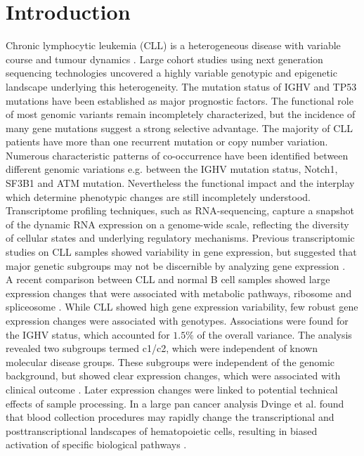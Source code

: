 

\section{Introduction}

Chronic lymphocytic leukemia (CLL) is a heterogeneous disease with variable course and tumour dynamics \citep{Zenz2010, Fabbri2016}. Large cohort studies using next generation sequencing technologies uncovered a highly variable genotypic and epigenetic landscape underlying this heterogeneity. The mutation status of IGHV and TP53 mutations have been established as major prognostic factors. The functional role of most genomic variants remain incompletely characterized, but the incidence of many gene mutations suggest a strong selective advantage. The majority of CLL patients have more than one recurrent mutation or copy number variation. Numerous characteristic patterns of co-occurrence have been identified between different genomic variations e.g. between the IGHV mutation status, Notch1, SF3B1 and ATM mutation. Nevertheless the functional impact and the interplay which determine phenotypic changes are still incompletely understood. \\

Transcriptome profiling techniques, such as RNA-sequencing, capture a snapshot of the dynamic RNA expression on a genome-wide scale, reflecting the diversity of cellular states and underlying regulatory mechanisms. Previous transcriptomic studies on CLL samples showed variability in gene expression, but suggested that major genetic subgroups may not be discernible by analyzing gene expression \citep{Ferreira2014a, Rosenwald2001}. \\
 
A recent comparison between CLL and normal B cell samples showed large expression changes that were associated with metabolic pathways, ribosome and spliceosome \citep{Ferreira2014a}.  While CLL showed high gene expression variability, few robust gene expression changes were associated with genotypes. Associations were found for the IGHV status, which accounted for $1.5\%$ of the overall variance. The analysis revealed two subgroups termed c1/c2, which were independent of known molecular disease groups. These subgroups were independent of the genomic background, but showed clear expression changes, which were associated with clinical outcome \citep{Ferreira2014a}.
Later expression changes were linked to potential technical effects of sample processing. In a large pan cancer analysis Dvinge et al. found that blood collection procedures may rapidly change the transcriptional and posttranscriptional landscapes of hematopoietic cells, resulting in biased activation of specific biological pathways \citep{Dvinge2014}. \\


